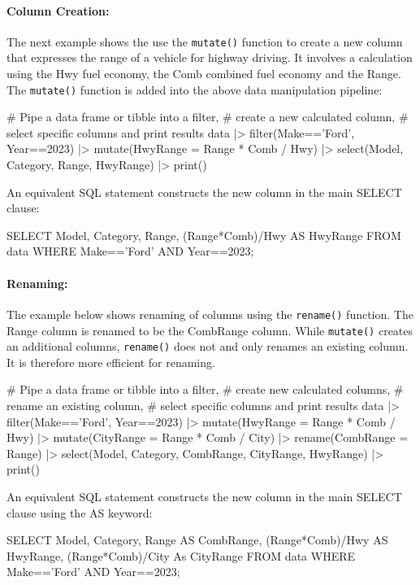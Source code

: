 \paragraph*{Column Creation:} The next example shows the use the \texttt{mutate()} function to create a new column that expresses the range of a vehicle for highway driving. It involves a calculation using the Hwy fuel economy, the Comb combined fuel economy and the Range. The \texttt{mutate()} function is added into the above data manipulation pipeline:

\begin{Rcode}
# Pipe a data frame or tibble into a filter,
# create a new calculated column,
# select specific columns and print results
data |> 
  filter(Make=='Ford', Year==2023) |> 
  mutate(HwyRange = Range * Comb / Hwy) |>
  select(Model, Category, Range, HwyRange) |>
  print()
\end{Rcode}

An equivalent SQL statement constructs the new column in the main SELECT clause:

\begin{sqlcode}
SELECT Model, Category, Range, (Range*Comb)/Hwy AS HwyRange 
   FROM data 
   WHERE Make=='Ford' AND Year==2023;
\end{sqlcode}

\paragraph*{Renaming:} The example below shows renaming of columns using the \texttt{rename()} function. The Range column is renamed to be the CombRange column. While \texttt{mutate()} creates an additional columns, \texttt{rename()} does not and only renames an existing column. It is therefore more efficient for renaming.

\begin{Rcode}
# Pipe a data frame or tibble into a filter,
# create new calculated columns,
# rename an existing column,
# select specific columns and print results
data |> 
  filter(Make=='Ford', Year==2023) |> 
  mutate(HwyRange = Range * Comb / Hwy) |>
  mutate(CityRange = Range * Comb / City) |>
  rename(CombRange = Range) |>
  select(Model, Category, CombRange, CityRange, HwyRange) |>
  print()
\end{Rcode}

An equivalent SQL statement constructs the new column in the main SELECT clause using the AS keyword:

\begin{sqlcode}
SELECT Model, Category, 
      Range AS CombRange,
      (Range*Comb)/Hwy AS HwyRange, 
      (Range*Comb)/City As CityRange
   FROM data 
   WHERE Make=='Ford' AND Year==2023;
\end{sqlcode}

